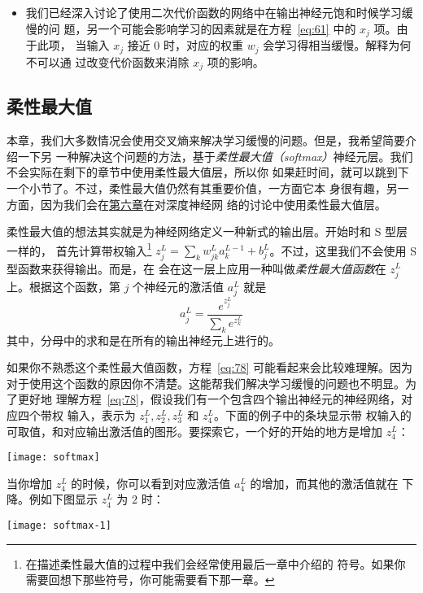 \begin{itemize}
\item 我们已经深入讨论了使用二次代价函数的网络中在输出神经元饱和时候学习缓慢的问
  题，另一个可能会影响学习的因素就是在方程~\eqref{eq:61} 中的 $x_j$ 项。由于此项，
  当输入 $x_j$ 接近 $0$ 时，对应的权重 $w_j$ 会学习得相当缓慢。解释为何不可以通
  过改变代价函数来消除 $x_j$ 项的影响。
\end{itemize}

\subsection{柔性最大值}
\label{subsec:softmax}

本章，我们大多数情况会使用交叉熵来解决学习缓慢的问题。但是，我希望简要介绍一下另
一种解决这个问题的方法，基于\emph{柔性最大值（softmax）}神经元层。我们不会实际在剩下的章节中使用柔性最大值层，所以你
如果赶时间，就可以跳到下一个小节了。不过，柔性最大值仍然有其重要价值，一方面它本
身很有趣，另一方面，因为我们会在\hyperref[ch:Deeplearning]{第六章}在对深度神经网
络的讨论中使用柔性最大值层。

柔性最大值的想法其实就是为神经网络定义一种新式的输出层。开始时和 S 型层一样的，
首先计算带权输入\footnote{在描述柔性最大值的过程中我们会经常使用最后一章中介绍的
  符号。如果你需要回想下那些符号，你可能需要看下那一章。} $z^L_j = \sum_{k}
w^L_{jk} a^{L-1}_k + b^L_j$。不过，这里我们不会使用 S 型函数来获得输出。而是，在
会在这一层上应用一种叫做\emph{柔性最大值函数}在 $z^L_j$ 上。根据这个函数，第 $j$ 个神经元的激活值 $a^L_j$ 就是
\begin{equation}
  a^L_j = \frac{e^{z^L_j}}{\sum_k e^{z^L_k}}
  \label{eq:78}\tag{78}
\end{equation}
其中，分母中的求和是在所有的输出神经元上进行的。

如果你不熟悉这个柔性最大值函数，方程~\eqref{eq:78} 可能看起来会比较难理解。因为
对于使用这个函数的原因你不清楚。这能帮我们解决学习缓慢的问题也不明显。为了更好地
理解方程~\eqref{eq:78}，假设我们有一个包含四个输出神经元的神经网络，对应四个带权
输入，表示为 $z^L_1, z^L_2, z^L_3$ 和 $z^L_4$。下面的例子中的条块显示带
权输入的可取值，和对应输出激活值的图形。要探索它，一个好的开始的地方是增加 $z^L_4$：
\begin{center}
  \texttt{[image: softmax]}
\end{center}

当你增加 $z^L_4$ 的时候，你可以看到对应激活值 $a^L_4$ 的增加，而其他的激活值就在
下降。例如下图显示 $z^L_4$ 为 $2$ 时：
\begin{center}
  \texttt{[image: softmax-1]}
\end{center}

